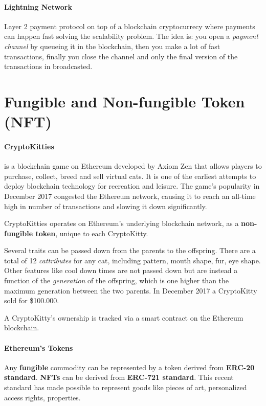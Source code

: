 \paragraph{Lightning Network} Layer 2 payment protocol on top of a blockchain cryptocurrecy where payments can happen fast solving the scalability problem. The idea is: you open a \emph{payment channel} by queueing it in the blockchain, then you make a lot of fast transactions, finally you close the channel and only the final version of the transactions in broadcasted.

\section{Fungible and Non-fungible Token (NFT)}


\paragraph{CryptoKitties} is a blockchain game on Ethereum developed by Axiom Zen that allows players to purchase, collect, breed and sell virtual cats. It is one of the earliest attempts to deploy blockchain technology for recreation and leisure. The game's popularity in December 2017 congested the Ethereum network, causing it to reach an all-time high in number of transactions and slowing it down significantly.

CryptoKitties operates on Ethereum's underlying blockchain network, as a \textbf{non-fungible token}, unique to each CryptoKitty.

Several traits can be passed down from the parents to the offspring. There are a total of 12 \emph{cattributes} for any cat, including pattern, mouth shape, fur, eye shape. Other features like cool down times are not passed down but are instead a function of the \emph{generation} of the offspring, which is one higher than the maximum generation between the two parents. In December 2017 a CryptoKitty sold for \$100.000.

A CryptoKitty's ownership is tracked via a smart contract on the Ethereum blockchain.

\paragraph{Ethereum's Tokens} Any \textbf{fungible} commodity can be represented by a token derived from \textbf{ERC-20 standard}. \textbf{NFTs} can be derived from \textbf{ERC-721 standard}. This recent standard has made possible to represent goods like pieces of art, personalized access rights, properties.

